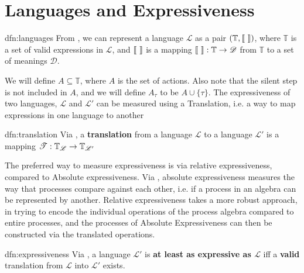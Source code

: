 \documentclass[../hons_project.tex]{subfiles}
\begin{document}
    
\section{Languages and Expressiveness}\label{ssec:language}

\begin{dfn}[Languages]{dfn:languages}{}
   From \cite{DBLP:conf/fossacs/Glabbeek18}, we can represent a language $\mathscr{L}$ as a pair $(\mathbb{T}, \llbracket \,\, \rrbracket)$, where $\mathbb{T}$ is a set of valid expressions in $\mathscr{L}$, and $\llbracket \,\, \rrbracket$ is a mapping $\llbracket \,\, \rrbracket : \mathbb{T} \to \mathscr{D}$ from $\mathbb{T}$ to a set of meanings $\mathscr{D}$.
\end{dfn}

We will define $A \subseteq \mathbb{T}$, where $A$ is the set of actions. Also note that the silent step is not included in $A$, and we will define $A_{\tau}$ to be $A \cup \{\tau\}$. The expressiveness of two languages, $\mathscr{L}$ and $\mathscr{L}'$ can be measured using a Translation, i.e. a way to map expressions in one language to another
\begin{dfn}[Translation]{dfn:translation}{}
   Via  \cite{DBLP:conf/fossacs/Glabbeek18}, a \textbf{translation} from a language $\mathscr{L}$ to a language $\mathscr{L'}$ is a mapping $\mathscr{T} : \mathbb{T}_{\mathscr{L}} \to \mathbb{T}_{\mathscr{L}'}$
\end{dfn}



The preferred way to measure expressiveness is via relative expressiveness, compared to Absolute expressiveness. Via \cite{parrowExpressivenessProcessAlgebras2008}, absolute expressiveness measures the way that processes compare against each other, i.e. if a process in an algebra can be represented by another. Relative expressiveness takes a more robust approach, in trying to encode the individual operations of the process algebra compared to entire processes, and the processes of Absolute Expressiveness can then be constructed via the translated operations. 

\begin{dfn}[Expressiveness]{dfn:expressiveness}{}
   Via  \cite{DBLP:conf/fossacs/Glabbeek18}, a language $\mathscr{L}'$ is \textbf{at least as expressive as $\mathscr{L}$} iff a \textbf{valid} translation from $\mathscr{L}$ into $\mathscr{L}'$ exists.
\end{dfn}
\end{document}
